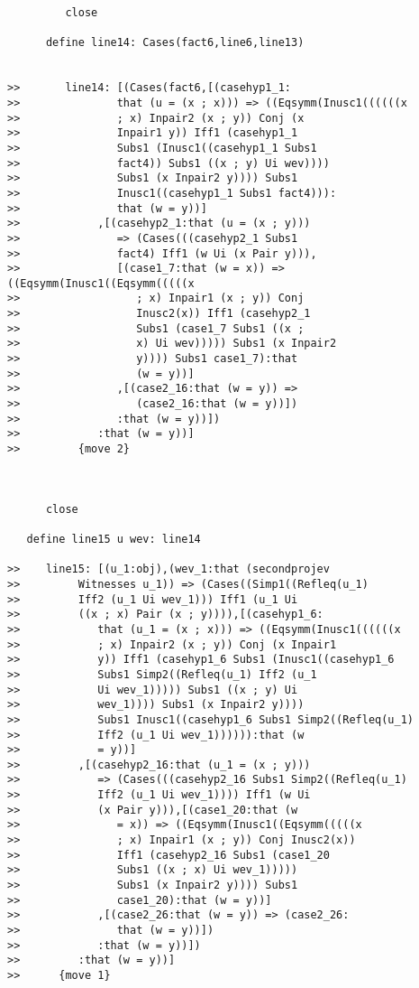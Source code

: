 \documentclass[12pt]{article}
\begin{document}
\begin{verbatim}
         close

      define line14: Cases(fact6,line6,line13)


>>       line14: [(Cases(fact6,[(casehyp1_1:
>>               that (u = (x ; x))) => ((Eqsymm(Inusc1((((((x
>>               ; x) Inpair2 (x ; y)) Conj (x
>>               Inpair1 y)) Iff1 (casehyp1_1
>>               Subs1 (Inusc1((casehyp1_1 Subs1
>>               fact4)) Subs1 ((x ; y) Ui wev))))
>>               Subs1 (x Inpair2 y)))) Subs1
>>               Inusc1((casehyp1_1 Subs1 fact4))):
>>               that (w = y))]
>>            ,[(casehyp2_1:that (u = (x ; y)))
>>               => (Cases(((casehyp2_1 Subs1
>>               fact4) Iff1 (w Ui (x Pair y))),
>>               [(case1_7:that (w = x)) => ((Eqsymm(Inusc1((Eqsymm(((((x
>>                  ; x) Inpair1 (x ; y)) Conj
>>                  Inusc2(x)) Iff1 (casehyp2_1
>>                  Subs1 (case1_7 Subs1 ((x ;
>>                  x) Ui wev))))) Subs1 (x Inpair2
>>                  y)))) Subs1 case1_7):that
>>                  (w = y))]
>>               ,[(case2_16:that (w = y)) =>
>>                  (case2_16:that (w = y))])
>>               :that (w = y))])
>>            :that (w = y))]
>>         {move 2}



      close

   define line15 u wev: line14

>>    line15: [(u_1:obj),(wev_1:that (secondprojev
>>         Witnesses u_1)) => (Cases((Simp1((Refleq(u_1)
>>         Iff2 (u_1 Ui wev_1))) Iff1 (u_1 Ui
>>         ((x ; x) Pair (x ; y)))),[(casehyp1_6:
>>            that (u_1 = (x ; x))) => ((Eqsymm(Inusc1((((((x
>>            ; x) Inpair2 (x ; y)) Conj (x Inpair1
>>            y)) Iff1 (casehyp1_6 Subs1 (Inusc1((casehyp1_6
>>            Subs1 Simp2((Refleq(u_1) Iff2 (u_1
>>            Ui wev_1))))) Subs1 ((x ; y) Ui
>>            wev_1)))) Subs1 (x Inpair2 y))))
>>            Subs1 Inusc1((casehyp1_6 Subs1 Simp2((Refleq(u_1)
>>            Iff2 (u_1 Ui wev_1)))))):that (w
>>            = y))]
>>         ,[(casehyp2_16:that (u_1 = (x ; y)))
>>            => (Cases(((casehyp2_16 Subs1 Simp2((Refleq(u_1)
>>            Iff2 (u_1 Ui wev_1)))) Iff1 (w Ui
>>            (x Pair y))),[(case1_20:that (w
>>               = x)) => ((Eqsymm(Inusc1((Eqsymm(((((x
>>               ; x) Inpair1 (x ; y)) Conj Inusc2(x))
>>               Iff1 (casehyp2_16 Subs1 (case1_20
>>               Subs1 ((x ; x) Ui wev_1)))))
>>               Subs1 (x Inpair2 y)))) Subs1
>>               case1_20):that (w = y))]
>>            ,[(case2_26:that (w = y)) => (case2_26:
>>               that (w = y))])
>>            :that (w = y))])
>>         :that (w = y))]
>>      {move 1}




\end{verbatim}
\end{document}
